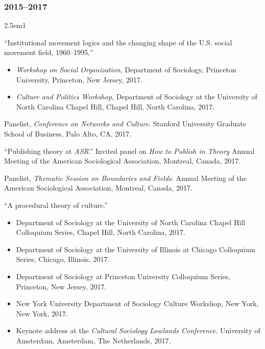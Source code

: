 \documentclass[
]{article}
\providecommand{\tightlist}{%
  \setlength{\itemsep}{0pt}\setlength{\parskip}{0pt}}
\newenvironment{cventry}{\begin{hangparas}{2.5em}{1}}{\end{hangparas}}
\begin{document}
\subsubsection{2015--2017}\label{section-23}

\begin{cventry}

``Institutional movement logics and the changing shape of the U.S.
social movement field, 1960--1995,''

\begin{itemize}
\tightlist
\item
  \emph{Workshop on Social Organization}, Department of Sociology,
  Princeton University, Princeton, New Jersey, 2017.
\item
  \emph{Culture and Politics Workshop}, Department of Sociology at the
  University of North Carolina Chapel Hill, Chapel Hill, North Carolina,
  2017.
\end{itemize}

Panelist, \emph{Conference on Networks and Culture}. Stanford University
Graduate School of Business, Palo Alto, CA, 2017.

``Publishing theory at \emph{ASR}.'' Invited panel on \emph{How to
Publish in Theory} Annual Meeting of the American Sociological
Association, Montreal, Canada, 2017.

Panelist, \emph{Thematic Session on Boundaries and Fields}. Annual
Meeting of the American Sociological Association, Montreal, Canada,
2017.

``A procedural theory of culture.''

\begin{itemize}
\tightlist
\item
  Department of Sociology at the University of North Carolina Chapel
  Hill Colloquium Series, Chapel Hill, North Carolina, 2017.
\item
  Department of Sociology at the University of Illinois at Chicago
  Colloquium Series, Chicago, Illinois, 2017.
\item
  Department of Sociology at Princeton University Colloquium Series,
  Princeton, New Jersey, 2017.
\item
  New York University Department of Sociology Culture Workshop, New
  York, New York, 2017.
\item
  Keynote address at the \emph{Cultural Sociology Lowlands Conference}.
  University of Amsterdam, Amsterdam, The Netherlands, 2017.
\end{itemize}


\end{cventry}
\end{document}
